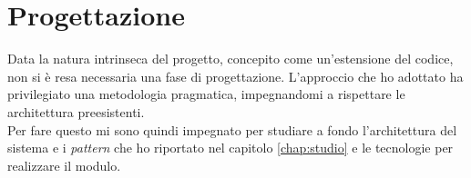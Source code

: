 \section{Progettazione}
Data la natura intrinseca del progetto, concepito come un'estensione del codice, non si è resa necessaria una fase di 
progettazione.
L'approccio che ho adottato ha privilegiato una metodologia pragmatica, impegnandomi a rispettare le architettura preesistenti.\\
Per fare questo mi sono quindi impegnato per studiare a fondo l'architettura del sistema e i \textit{pattern} che ho riportato nel 
capitolo \ref{chap:studio} e le tecnologie per realizzare il modulo.